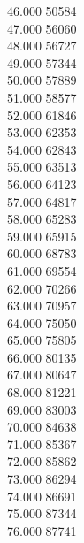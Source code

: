 { 46.000	50584 \\
 47.000	56060 \\
 48.000	56727 \\
 49.000	57344 \\
 50.000	57889 \\
 51.000	58577 \\
 52.000	61846 \\
 53.000	62353 \\
 54.000	62843 \\
 55.000	63513 \\
 56.000	64123 \\
 57.000	64817 \\
 58.000	65283 \\
 59.000	65915 \\
 60.000	68783 \\
 61.000	69554 \\
 62.000	70266 \\
 63.000	70957 \\
 64.000	75050 \\
 65.000	75805 \\
 66.000	80135 \\
 67.000	80647 \\
 68.000	81221 \\
 69.000	83003 \\
 70.000	84638 \\
 71.000	85367 \\
 72.000	85862 \\
 73.000	86294 \\
 74.000	86691 \\
 75.000	87344 \\
 76.000	87741 \\
}
